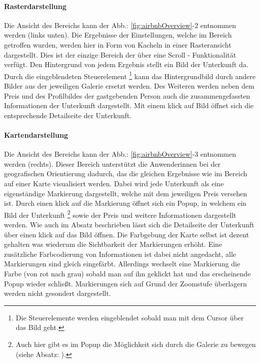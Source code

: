 \documentclass[../Bachelorarbeit.tex]{subfiles}
\begin{document}
\paragraph{Rasterdarstellung}
\label{airbnb:gridview}
Die Ansicht des Bereichs  kann der Abb.: \ref{fig:airbnbOverview}-2 entnommen werden (links unten).
Die Ergebnisse der Einstellungen, welche im Bereich  getroffen wurden, werden hier in Form von Kacheln in einer Rasteransicht dargestellt.
Dies ist der einzige Bereich der über eine Scroll - Funktionalität verfügt.
Den Hintergrund von jedem Ergebnis stellt ein Bild der Unterkunft da. 
Durch die eingeblendeten Steuerelement
	\footnote{Die Steuerelemente werden eingeblendet sobald man mit dem Cursor über das Bild geht.} 
kann das Hintergrundbild durch andere Bilder aus der jeweiligen Galerie ersetzt werden. 
Des Weiteren werden neben dem Preis und des Profilbildes der gastgebenden Person auch die zusammengefassten Informationen der Unterkunft dargestellt. 
Mit einem klick auf Bild öffnet sich die entsprechende Detailseite der Unterkunft. 

\paragraph{Kartendarstellung}
\label{airbnb:map}
Die Ansicht des Bereichs  kann der Abb.: \ref{fig:airbnbOverview}-3 entnommen werden (rechts).
Dieser Bereich unterstützt die Anwenderinnen bei der geografischen Orientierung dadurch, das die gleichen Ergebnisse wie im Bereich  auf einer Karte visualisiert werden.
Dabei wird jede Unterkunft als eine eigenständige Markierung dargestellt, welche mit dem jeweiligen Preis versehen ist.
Durch einen klick auf die Markierung öffnet sich ein Popup, in welchem ein Bild der Unterkunft
\footnote{
	Auch hier gibt es im Popup die Möglichkeit sich durch die Galerie zu bewegen (siehe Absatz: ).
	} 
sowie der Preis und weitere Informationen dargestellt werden. 
Wie auch im Absatz  beschrieben lässt sich die Detailseite der Unterkunft über einen klick auf das Bild öffnen.
Die Farbgebung der Karte selbst ist dezent gehalten was wiederum die Sichtbarkeit der Markierungen erhöht.
Eine zusätzliche Farbcodierung von Informationen ist dabei nicht angedacht, alle Markierungen sind gleich eingefärbt.
Allerdings wechselt eine Markierung die Farbe (von rot nach grau) sobald man auf ihn geklickt hat und das erscheinende Popup wieder schließt.
Markierungen sich auf Grund der Zoomstufe überlagern werden nicht gesondert dargestellt.
\end{document}
